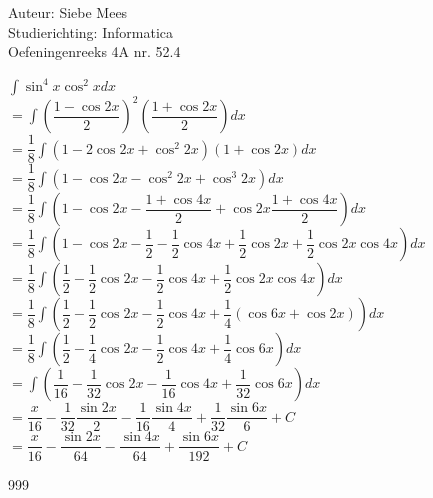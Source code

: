 \documentclass[a4paper]{article}
\begin{document}
  
\noindent \large Auteur: Siebe Mees \\
\noindent \large Studierichting: Informatica\\
\noindent \large Oefeningenreeks 4A nr. 52.4\\

\medskip

\normalsize

$\displaystyle\int \sin^4 x \cos^2 x dx$\\

$= \displaystyle\int \left( \dfrac{1-\cos 2x}{2} \right)^2 \left( \dfrac{1+\cos 2x}{2} \right) dx$\\

$= \dfrac{1}{8}\displaystyle\int \left( 1-2\cos 2x+\cos^2 2x \right)\left( 1+\cos 2x \right) dx$\\

$= \dfrac{1}{8}\displaystyle\int \left( 1-\cos 2x-\cos^2 2x+\cos^3 2x \right) dx$\\

$= \dfrac{1}{8}\displaystyle\int \left( 1-\cos 2x-\dfrac{1+\cos 4x}{2}+\cos 2x \dfrac{1+\cos 4x}{2} \right) dx$\\

$= \dfrac{1}{8}\displaystyle\int \left( 1-\cos 2x-\dfrac{1}{2}-\dfrac{1}{2}\cos 4x+\dfrac{1}{2}\cos 2x+\dfrac{1}{2}\cos 2x \cos 4x \right) dx$\\

$= \dfrac{1}{8}\displaystyle\int \left( \dfrac{1}{2}-\dfrac{1}{2}\cos 2x-\dfrac{1}{2}\cos 4x+\dfrac{1}{2}\cos 2x \cos 4x \right) dx$\\

$= \dfrac{1}{8}\displaystyle\int \left( \dfrac{1}{2}-\dfrac{1}{2}\cos 2x-\dfrac{1}{2}\cos 4x+\dfrac{1}{4}\left( \cos 6x+\cos 2x \right) \right) dx$\\

$= \dfrac{1}{8}\displaystyle\int \left( \dfrac{1}{2}-\dfrac{1}{4}\cos 2x-\dfrac{1}{2}\cos 4x+\dfrac{1}{4}\cos 6x \right) dx$\\

$= \displaystyle\int \left( \dfrac{1}{16}-\dfrac{1}{32}\cos 2x-\dfrac{1}{16}\cos 4x+\dfrac{1}{32}\cos 6x \right) dx$\\

$= \dfrac{x}{16}-\dfrac{1}{32}\dfrac{\sin 2x}{2}-\dfrac{1}{16}\dfrac{\sin 4x}{4}+\dfrac{1}{32}\dfrac{\sin 6x}{6}+C$\\

$= \dfrac{x}{16}-\dfrac{\sin 2x}{64}-\dfrac{\sin 4x}{64}+\dfrac{\sin 6x}{192}+C$\\

\begin{thebibliography}{999}
\end{thebibliography}
\end{document}
